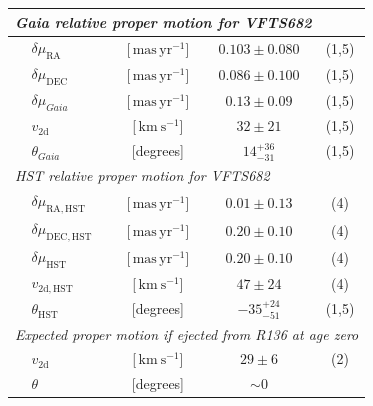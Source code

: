 \documentclass[apjl,twocolumn]{emulateapj}
\newcommand{\SdM}[1]{{{\color{brown}{#1}}}}
\newcommand{\kms}{{\,\mathrm{km\ s^{-1}}}}
\newcommand{\masyr}{\,\mathrm{mas}\,\mathrm{yr}^{-1}}
\begin{document}
\begin{table}
\begin{center}
\begin{tabular}{llc|c|c}
                


      \multicolumn{5}{l}{\emph{Gaia relative proper motion for VFTS682 }} \\
      \hline
      &$\delta\mu_\mathrm{RA}$  &[$\masyr$] & $0.103\pm0.080$ & (1,5) \\
      &$\delta\mu_\mathrm{DEC}$  &[$\masyr$] & $0.086\pm0.100$ &  (1,5) \\
      &$\delta\mu_{Gaia}$  &[$\masyr$] & $0.13\pm0.09$ &  (1,5) \\
      &$v_\mathrm{2d}$  &[$\kms$] & $32\pm21$ & (1,5)\\  
      &$\theta_{Gaia}$  &[degrees] &  $14_{-31}^{+36}$  & (1,5)\\  

 \hline     
      \multicolumn{5}{l}{\emph{HST relative proper motion for VFTS682}} \\
            \hline
      &$\delta\mu_\mathrm{RA, HST}$  &[$\masyr$] & $0.01\pm0.13$ & (4) \\
      &$\delta\mu_\mathrm{DEC, HST}$  &[$\masyr$] & $0.20\pm0.10$ &  (4) \\
       &$\delta\mu_\mathrm{HST}$  &[$\masyr$] & $0.20\pm0.10$ &  (4) \\
                  &$v_\mathrm{2d, HST}$  &[$\kms$] & $47\pm24$ & (4)\\  
                      &$\theta_\mathrm{HST}$  &[degrees] &   $-35_{-51}^{+24}$   & (1,5)\\  
    \hline
       \multicolumn{5}{l}{\emph{Expected proper motion if ejected from
      R136 at age zero}} \\
      \hline
      &$v_\mathrm{2d}$  &[$\kms$] & $29\pm 6$ & (2) \\  
      &$\theta$  &[degrees] &  $\sim0$  & \\ 
       \hline

     
\hline


      \hline


\end{tabular}
\end{center}
\end{table}
\end{document}
